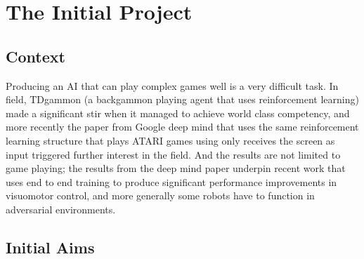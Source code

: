   \section{The Initial Project}
  \subsection{Context}
  Producing an AI that can play complex games well is a very difficult task. In field, TDgammon (a backgammon playing agent that uses reinforcement learning) made a significant stir when it managed to achieve world class competency, and more recently the paper from Google deep mind that uses the same reinforcement learning structure that plays ATARI games using only receives the screen as input triggered further interest in the field. And the results are not limited to game playing; the results from the deep mind paper underpin recent work that uses end to end training to produce significant performance improvements in visuomotor control, and more generally some robots have to function in adversarial environments.

\subsection{Initial Aims}